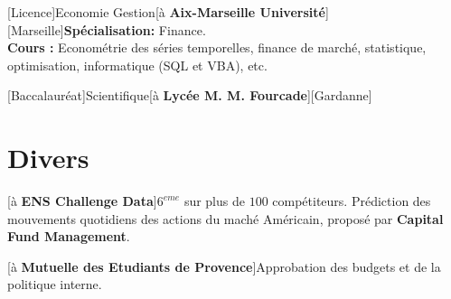 \documentclass[a4paper]{arthur-cv}
\begin{document}
\begin{textblock}{20.5}
\begin{minipage}[t]{0.61\textwidth}
\begin{rightenv}
        [Licence]{Economie Gestion}[à \textbf{Aix-Marseille Université}][Marseille]{\textbf{Spécialisation:} Finance.\\\textbf{Cours :} Econométrie des séries temporelles, finance de marché, statistique, optimisation, informatique (SQL et VBA), etc.}

        [Baccalauréat]{Scientifique}[à \textbf{Lycée M. M. Fourcade}][Gardanne]{}
      \end{rightenv}

    \section{Divers}
      \begin{rightenv}
        [à \textbf{ENS Challenge Data}]{\href{http://datachallenge.cfm.fr/t/end-of-year-ranking-2019-official-top-10/243}{\textcolor{colhyperlink}{$6^{eme}$}} sur plus de $100$ compétiteurs. Prédiction des mouvements quotidiens des actions du maché Américain, proposé par \textbf{Capital Fund Management}.}

        [à \textbf{Mutuelle des Etudiants de Provence}]{Approbation des budgets et de la politique interne.}


      \end{rightenv}

  \end{minipage}

\end{textblock}
\end{document}
